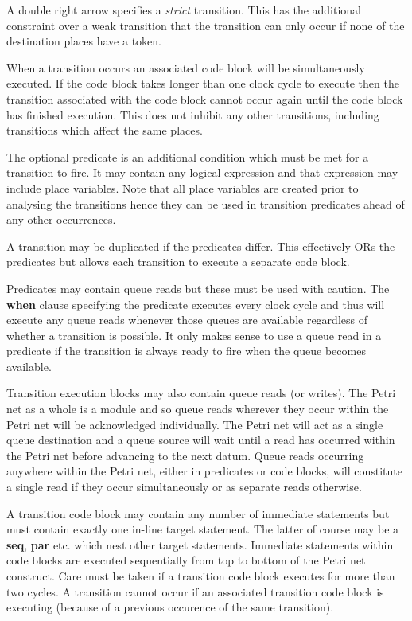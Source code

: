         A double right arrow specifies a {\em strict} transition. This
        has the additional constraint over a weak transition that the
        transition can only occur if none of the destination places have
        a token.
        
        When a transition occurs an associated code block will be
        simultaneously executed. If the code block takes longer than one
        clock cycle to execute then the transition associated with the code
        block cannot occur again until the code block has finished execution.
        This does not inhibit any other transitions, including transitions
        which affect the same places.
        
        The optional predicate is an additional condition which must be met
        for a transition to fire. It may contain any logical expression and that
        expression may include place variables. Note that all place
        variables are created prior to analysing the transitions hence
        they can be used in transition predicates ahead of any other occurrences.

        A transition may be duplicated if the predicates differ. This
        effectively ORs the predicates but allows each transition to
        execute a separate code block.

        Predicates may contain queue reads but these must be used with
        caution. The {\bf when} clause specifying the predicate executes
        every clock cycle and thus will execute any queue reads whenever
        those queues are available regardless of whether a transition is
        possible. It only makes sense to use a queue read in a predicate
        if the transition is always ready to fire when the queue becomes
        available.
        
        Transition execution blocks may also contain queue reads (or writes).
        The Petri net as a whole is a module and so queue reads wherever they
        occur within the Petri net will be acknowledged individually. The
        Petri net will act as a single queue destination and a queue source
        will wait until a read has occurred within the Petri net before
        advancing to the next datum. Queue reads occurring anywhere within
        the Petri net, either in predicates or code blocks, will constitute
        a single read if they occur simultaneously or as separate reads
        otherwise.
        
        A transition code block may contain any number of immediate statements but
        must contain exactly one in-line target statement. The latter of course may
        be a {\bf seq}, {\bf par} etc. which nest other target statements.
        Immediate statements within code blocks are executed sequentially from top
        to bottom of the Petri net construct. Care must be taken if a transition
        code block executes for more than two cycles. A transition cannot occur if
        an associated transition code block is executing (because of a previous
        occurence of the same transition).




 
